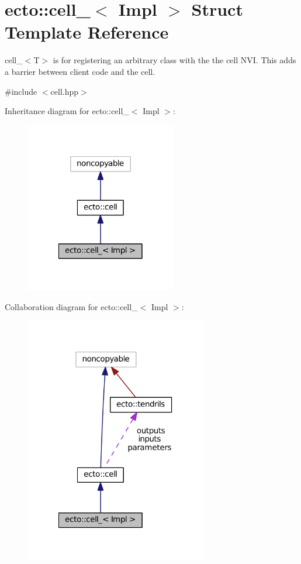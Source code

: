 \hypertarget{structecto_1_1cell__}{\section{ecto\-:\-:cell\-\_\-$<$ Impl $>$ Struct Template Reference}
\label{structecto_1_1cell__}
}


cell\-\_\-$<$\-T$>$ is for registering an arbitrary class with the the cell N\-V\-I. This adds a barrier between client code and the cell.  




{\ttfamily \#include $<$cell.\-hpp$>$}



Inheritance diagram for ecto\-:\-:cell\-\_\-$<$ Impl $>$\-:\nopagebreak
\begin{figure}[H]
\begin{center}
\leavevmode
\includegraphics[width=186pt]{structecto_1_1cell____inherit__graph}
\end{center}
\end{figure}


Collaboration diagram for ecto\-:\-:cell\-\_\-$<$ Impl $>$\-:\nopagebreak
\begin{figure}[H]
\begin{center}
\leavevmode
\includegraphics[width=225pt]{structecto_1_1cell____coll__graph}
\end{center}
\end{figure}
